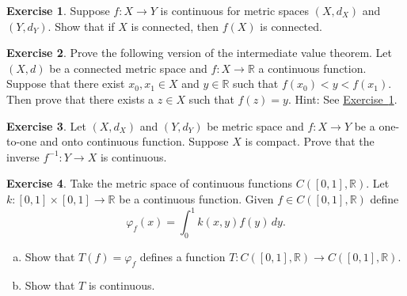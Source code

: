 \documentclass[12pt,openany]{book}
\newcommand{\R}{{\mathbb{R}}}
\newcommand{\myindex}[1]{#1\index{#1}}
\theoremstyle{plain}
\theoremstyle{remark}
\theoremstyle{definition}
\newenvironment{exbox}{%
    \def\FrameCommand{\vrule width 1pt \relax\hspace{10pt}}%
    \MakeFramed{\advance\hsize-\width\FrameRestore}%
}{%
    \endMakeFramed
}
\newenvironment{exparts}{%
    \leavevmode\begin{enumerate}[a),noitemsep,topsep=0pt,parsep=0pt,partopsep=0pt]
}{%
    \end{enumerate}
}
\theoremstyle{exercise}
\newtheorem{exercise}{Exercise}[section]
\theoremstyle{example}
\newcommand{\exerciseref}[1]{\hyperref[#1]{Exercise~\ref*{#1}}}
\begin{document}
\begin{exbox}
\begin{exercise} \label{exercise:msconnconn}
Suppose $f \colon X \to Y$ is continuous for metric spaces $(X,d_X)$
and $(Y,d_Y)$.  Show that if $X$ is connected, then $f(X)$ is connected.
\end{exercise}

\begin{exercise}
Prove the following version of the
intermediate value theorem.  Let $(X,d)$ be a connected
metric space and $f \colon X \to \R$ a continuous function.  Suppose that
there exist $x_0,x_1 \in X$ and $y \in \R$ such that $f(x_0) < y < f(x_1)$.
Then prove that there exists a $z \in X$ such that $f(z) = y$.
Hint: See \exerciseref{exercise:msconnconn}.
\end{exercise}


\begin{exercise}
Let $(X,d_X)$ and $(Y,d_Y)$ be metric space and
$f \colon X \to Y$ be a one-to-one and onto continuous function.  Suppose
$X$ is compact.  Prove that the inverse $f^{-1} \colon Y \to X$
is continuous.
\end{exercise}

\begin{exercise}
Take the metric space of continuous functions $C([0,1],\R)$.  Let
$k \colon [0,1] \times [0,1] \to \R$ be a continuous function.
Given $f \in C([0,1],\R)$ define
\begin{equation*}
\varphi_f(x) = \int_0^1 k(x,y) f(y)  \, dy .
\end{equation*}
\begin{exparts}
\item
Show that $T(f) = \varphi_f$ defines a function $T \colon C([0,1],\R) \to
C([0,1],\R)$.
\item
Show that $T$ is continuous.
\end{exparts}
\end{exercise}


\end{exbox}
\end{document}

